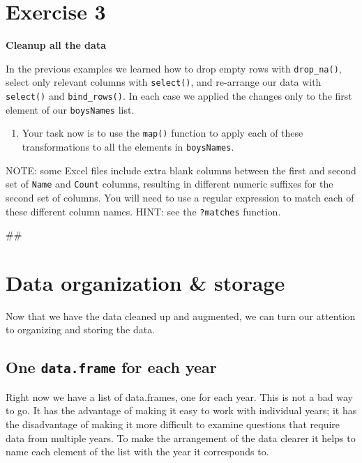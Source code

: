 \documentclass[]{book}
\newenvironment{Shaded}{\begin{snugshade}}{\end{snugshade}}
\newcommand{\NormalTok}[1]{#1}
\providecommand{\tightlist}{%
  \setlength{\itemsep}{0pt}\setlength{\parskip}{0pt}}
\begin{document}
\section{Exercise 3}\label{exercise-3-3}

\textbf{Cleanup all the data}

In the previous examples we learned how to drop empty rows with
\texttt{drop\_na()}, select only relevant columns with
\texttt{select()}, and re-arrange our data with \texttt{select()} and
\texttt{bind\_rows()}. In each case we applied the changes only to the
first element of our \texttt{boysNames} list.

\begin{enumerate}
\def\labelenumi{\arabic{enumi}.}
\tightlist
\item
  Your task now is to use the \texttt{map()} function to apply each of
  these transformations to all the elements in \texttt{boysNames}.
\end{enumerate}

NOTE: some Excel files include extra blank columns between the first and
second set of \texttt{Name} and \texttt{Count} columns, resulting in
different numeric suffixes for the second set of columns. You will need
to use a regular expression to match each of these different column
names. HINT: see the \texttt{?matches} function.

\begin{Shaded}
\begin{Highlighting}[]
\NormalTok{## }
\end{Highlighting}
\end{Shaded}

\section{Data organization \& storage}\label{data-organization-storage}

Now that we have the data cleaned up and augmented, we can turn our
attention to organizing and storing the data.

\subsection{\texorpdfstring{One \texttt{data.frame} for each
year}{One data.frame for each year}}\label{one-data.frame-for-each-year}

Right now we have a list of data.frames, one for each year. This is not
a bad way to go. It has the advantage of making it easy to work with
individual years; it has the disadvantage of making it more difficult to
examine questions that require data from multiple years. To make the
arrangement of the data clearer it helps to name each element of the
list with the year it corresponds to.
\end{document}
